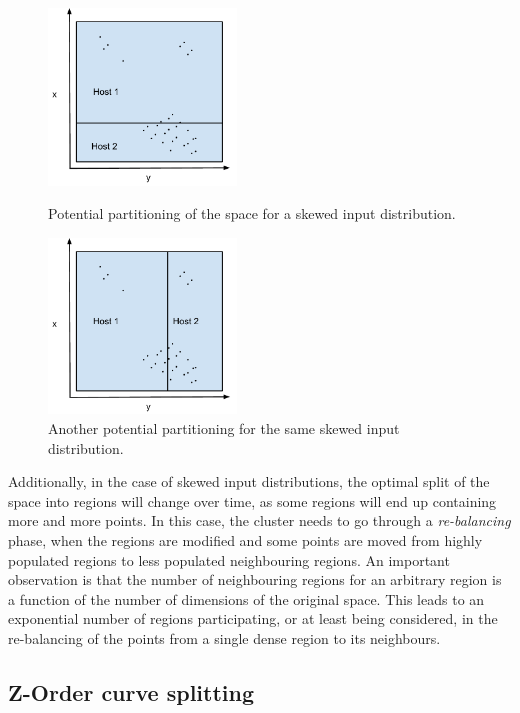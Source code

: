 \documentclass[11pt,a4paper]{globis-book}
\begin{document}
\begin{figure}[t]
\centering
\parbox{5cm}{
    \includegraphics[width=5cm]{images/geometric-bad-split}
    \caption{Potential partitioning of the space for a skewed input distribution.}
    \label{fig:geometric-bad-split}}
\qquad
\begin{minipage}{5cm}
    \includegraphics[width=5cm]{images/geometric-bad-split-2}
    \caption{Another potential partitioning for the same skewed input distribution.}
    \label{fig:geometric-bad-split-2}
\end{minipage}
\end{figure}
        
Additionally, in the case of skewed input distributions, the optimal split of the space into regions will change over time, as some regions will end up containing more and more points. In this case, the cluster needs to go through a \textit{re-balancing} phase, when the regions are modified and some points are moved from highly populated regions to less populated neighbouring regions. An important observation is that the number of neighbouring regions for an arbitrary region is a function of the number of dimensions of the original space. This leads to an exponential number of regions participating, or at least being considered, in the re-balancing of the points from a single dense region to its neighbours. 

\subsection{Z-Order curve splitting}
\end{document}
